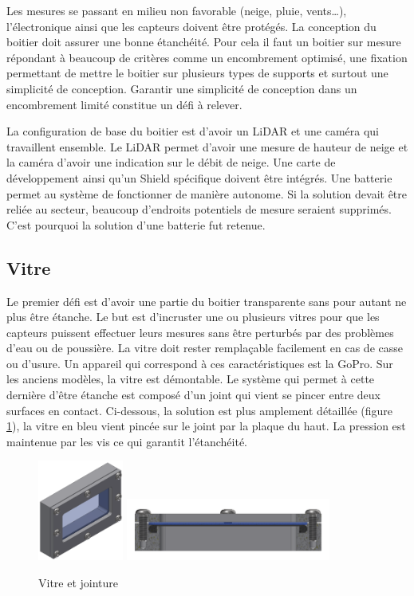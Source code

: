 Les mesures se passant en milieu non favorable (neige, pluie, vents…), l’électronique ainsi que les capteurs 
doivent être protégés. La conception du boitier doit assurer une bonne étanchéité. Pour cela il faut un 
boitier sur mesure répondant à beaucoup de critères comme un encombrement optimisé, une fixation permettant 
de mettre le boitier sur plusieurs types de supports et surtout une simplicité de conception. Garantir une 
simplicité de conception dans un encombrement limité constitue un défi à relever. \par
La configuration de base du boitier est d’avoir un LiDAR et une caméra qui travaillent ensemble. Le LiDAR 
permet d’avoir une mesure de hauteur de neige et la caméra d’avoir une indication sur le débit de neige. 
Une carte de développement ainsi qu’un Shield spécifique doivent être intégrés. Une batterie permet au système 
de fonctionner de manière autonome. Si la solution devait être reliée au secteur, beaucoup d’endroits potentiels 
de mesure seraient supprimés. C’est pourquoi la solution d’une batterie fut retenue. 

\subsection{Vitre}

Le premier défi est d’avoir une partie du boitier transparente sans pour autant ne plus être étanche. Le but 
est d’incruster une ou plusieurs vitres pour que les capteurs puissent effectuer leurs mesures sans être 
perturbés par des problèmes d’eau ou de poussière. La vitre doit rester remplaçable facilement en cas de 
casse ou d’usure. Un appareil qui correspond à ces caractéristiques est la GoPro. Sur les anciens modèles, 
la vitre est démontable. Le système qui permet à cette dernière d’être étanche est composé d’un joint qui 
vient se pincer entre deux surfaces en contact. Ci-dessous, la solution est plus amplement détaillée (figure \ref{fig:vitre}), 
la vitre en bleu vient pincée sur le joint par la plaque du haut. La pression est maintenue par les vis ce 
qui garantit l’étanchéité.

\begin{figure}[H]
    \centering
    \includegraphics[width=0.25\textwidth]{Images/photos_PGA/vitreInv.PNG}
    \includegraphics[width=0.6\textwidth]{Images/photos_PGA/vitreJoint.PNG}
    \caption{Vitre et jointure}
    \label{fig:vitre}
\end{figure}


